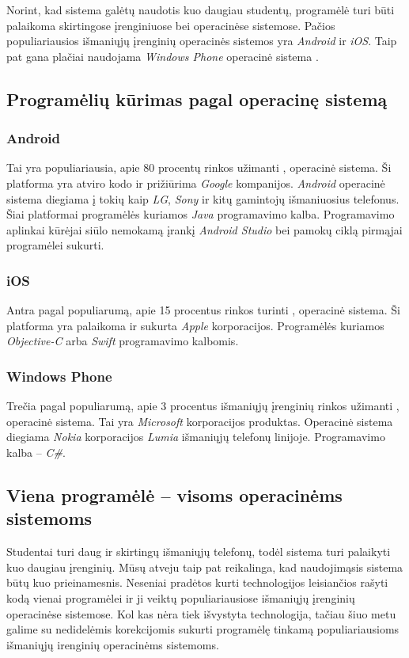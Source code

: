 \documentclass{VUMIFPSkursinis}
\begin{document}
Norint, kad sistema galėtų naudotis kuo daugiau studentų, programėlė turi būti palaikoma skirtingose įrenginiuose bei operacinėse sistemose. Pačios populiariausios išmaniųjų įrenginių operacinės sistemos yra \textit{Android} ir \textit{iOS}. Taip pat gana plačiai naudojama \textit{Windows Phone} operacinė sistema \cite{MarketShareByOS}.

\subsection{Programėlių kūrimas pagal operacinę sistemą}

\subsubsection{Android}
Tai yra populiariausia, apie 80 procentų rinkos užimanti \cite{MarketShareByOS}, operacinė sistema. Ši platforma yra atviro kodo ir prižiūrima \textit{Google} kompanijos. \textit{Android} operacinė sistema diegiama į tokių kaip \textit{LG}, \textit{Sony} ir kitų gamintojų išmaniuosius telefonus. Šiai platformai programėlės kuriamos \textit{Java} programavimo kalba. Programavimo aplinkai kūrėjai siūlo nemokamą įrankį \textit{Android Studio} bei pamokų ciklą pirmąjai programėlei sukurti.

\subsubsection{iOS}
Antra pagal populiarumą, apie 15 procentus rinkos turinti \cite{MarketShareByOS}, operacinė sistema. Ši platforma yra palaikoma ir sukurta \textit{Apple} korporacijos. Programėlės kuriamos \textit{Objective-C} arba \textit{Swift} programavimo kalbomis.

\subsubsection{Windows Phone}

Trečia pagal populiarumą, apie 3 procentus išmaniųjų įrenginių rinkos užimanti \cite{MarketShareByOS}, operacinė sistema. Tai yra \textit{Microsoft} korporacijos produktas. Operacinė sistema diegiama \textit{Nokia} korporacijos \textit{Lumia} išmaniųjų telefonų linijoje. Programavimo kalba – \textit{C\#}.

\subsection{Viena programėlė – visoms operacinėms sistemoms}
Studentai turi daug ir skirtingų išmaniųjų telefonų, todėl sistema turi palaikyti kuo daugiau įrenginių. Mūsų atveju taip pat reikalinga, kad naudojimąsis sistema būtų kuo prieinamesnis. Neseniai pradėtos kurti technologijos leisiančios rašyti kodą vienai programėlei ir ji veiktų populiariausiose \cite{MarketShareByOS} išmaniųjų įrenginių operacinėse sistemose. Kol kas nėra tiek išvystyta technologija, tačiau šiuo metu galime su nedidelėmis korekcijomis sukurti programėlę tinkamą populiariausioms išmaniųjų irenginių operacinėms sistemoms.
\end{document}
